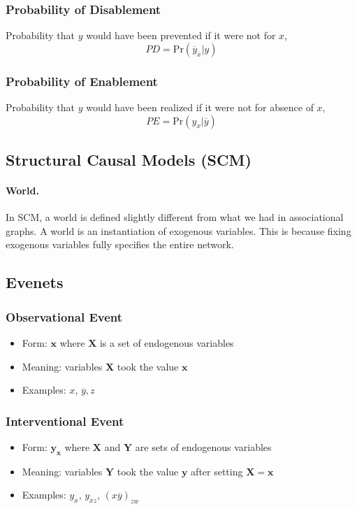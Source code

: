 \documentclass[11pt]{article}
\newcommand{\bx}{\mathbf{x}}
\newcommand{\by}{\mathbf{y}}
\newcommand{\pr}{\mathrm{Pr}}
\begin{document}
\subsubsection{Probability of Disablement} Probability that $y$ would have been prevented if it were not for $x$, 
\begin{equation}
	PD = \pr (\overbar y _ {\overbar x} | y )
\end{equation}

\subsubsection{Probability of Enablement} Probability that $y$ would have been realized if it were not for absence of $x$, 
\begin{equation}
	PE = \pr (y_x | \overbar y) 
\end{equation}


\subsection{Structural Causal Models (SCM)}

\paragraph{World.} In SCM, a world is defined slightly different from what we had in associational graphs. A world is an instantiation of exogenous variables. This is because fixing exogenous variables fully specifies the entire network. 

\subsection{Evenets}
\subsubsection{Observational Event}
\begin{itemize}
	\item Form: $\bx$ where $\mathbf X$ is a set of endogenous variables
	\item Meaning: variables $\mathbf X$ took the value $\bx$
	\item Examples: $x$, \quad $\overbar y, z$
\end{itemize}

\subsubsection{Interventional Event}
\begin{itemize}
	\item Form: $\mathbf y _ \mathbf x$ where $\mathbf X$ and $\mathbf Y $ are sets of endogenous variables
	\item Meaning: variables $\mathbf Y$ took the value $\by$ after setting $\mathbf X = \bx$
	\item Examples: $y_x$, \quad $y_{\overbar x z}$, \quad $(x\overbar y)_{zw}$
\end{itemize}
\end{document}
